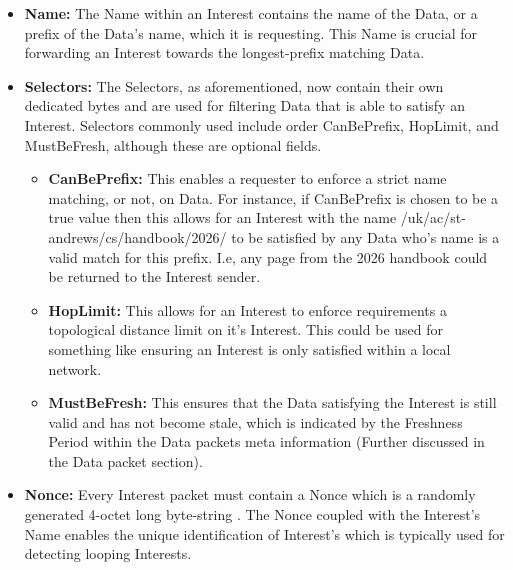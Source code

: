 \documentclass[12pt]{report}
\begin{document}
\begin{itemize}
    \item \textbf{Name:} The Name within an Interest contains the name of the Data, or a prefix of the Data's name, which it is requesting. This Name is crucial for forwarding an Interest towards the longest-prefix matching Data.
    \item \textbf{Selectors:} The Selectors, as aforementioned, now contain their own dedicated bytes and are used for filtering Data that is able to satisfy an Interest. Selectors commonly used include order CanBePrefix, HopLimit, and MustBeFresh, although these are optional fields.
    \begin{itemize}
        \item \textbf{CanBePrefix:} This enables a requester to enforce a strict name matching, or not, on Data. For instance, if CanBePrefix is chosen to be a true value then this allows for an Interest with the name /uk/ac/st-andrews/cs/handbook/2026/ to be satisfied by any Data who's name is a valid match for this prefix. I.e, any page from the 2026 handbook could be returned to the Interest sender.
        \item \textbf{HopLimit:} This allows for an Interest to enforce requirements a topological distance limit on it's Interest. This could be used for something like ensuring an Interest is only satisfied within a local network.
        \item \textbf{MustBeFresh:} This ensures that the Data satisfying the Interest is still valid and has not become stale, which is indicated by the Freshness Period within the Data packets meta information (Further discussed in the Data packet section).
    \end{itemize}
    \item \textbf{Nonce:} Every Interest packet must contain a Nonce which is a randomly generated 4-octet long byte-string \cite{noauthor_changes_nodate}. The Nonce coupled with the Interest's Name enables the unique identification of Interest's which is typically used for detecting looping Interests.
\end{itemize}
\end{document}
